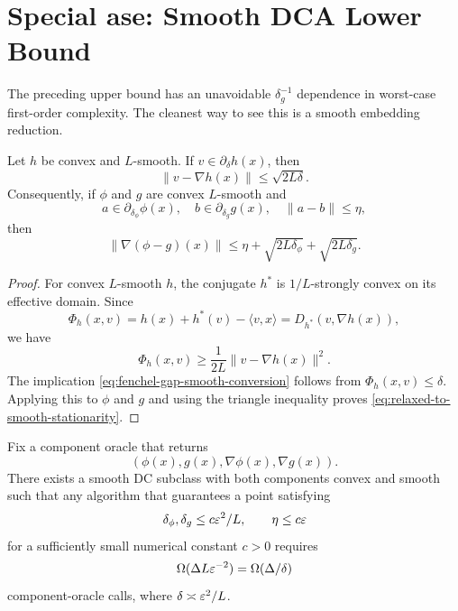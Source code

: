 \section{Special ase: Smooth DCA Lower Bound}
\label{Appendix: lower bound of DCA}
The preceding upper bound has an unavoidable $\delta_g^{-1}$ dependence in worst-case first-order complexity. The cleanest way to see this is a smooth embedding reduction.

\begin{lemma}
Let $h$ be convex and $L$-smooth. If $v\in\partial_\delta h(x)$, then
\begin{equation}
    \|v-\nabla h(x)\|\le \sqrt{2L\delta}.
    \label{eq:fenchel-gap-smooth-conversion}
\end{equation}
Consequently, if $\phi$ and $g$ are convex $L$-smooth and
\begin{equation}
    a\in\partial_{\delta_\phi}\phi(x),
    \quad
    b\in\partial_{\delta_g}g(x),
    \quad
    \|a-b\|\le\eta,
\end{equation}
then
\begin{equation}
    \|\nabla(\phi-g)(x)\|
    \le
    \eta+
    \sqrt{2L\delta_\phi}+
    \sqrt{2L\delta_g}.
    \label{eq:relaxed-to-smooth-stationarity}
\end{equation}
\end{lemma}

\begin{proof}
For convex $L$-smooth $h$, the conjugate $h^*$ is $1/L$-strongly convex on its effective domain. Since
\begin{equation}
    \Phi_h(x,v)=h(x)+h^*(v)-\langle v,x\rangle
    =D_{h^*}(v,\nabla h(x)),
\end{equation}
we have
\begin{equation}
    \Phi_h(x,v)\ge \frac{1}{2L}\|v-\nabla h(x)\|^2.
\end{equation}
The implication \eqref{eq:fenchel-gap-smooth-conversion} follows from $\Phi_h(x,v)\le\delta$. Applying this to $\phi$ and $g$ and using the triangle inequality proves \eqref{eq:relaxed-to-smooth-stationarity}.
\end{proof}

\begin{theorem}
Fix a component oracle that returns
\begin{equation}
    (\phi(x),g(x),\nabla\phi(x),\nabla g(x)).
\end{equation}
There exists a smooth DC subclass with both components convex and smooth such that any algorithm that guarantees a point satisfying
\begin{equation}
    \delta_\phi,\delta_g\le c\varepsilon^2/L,
    \qquad
    \eta\le c\varepsilon
\end{equation}
for a sufficiently small numerical constant $c>0$ requires
\begin{equation}
    \Omega(\Delta L\varepsilon^{-2})
    =\Omega(\Delta/\delta)
\end{equation}
component-oracle calls, where $\delta\asymp\varepsilon^2/L$.
\end{theorem}

